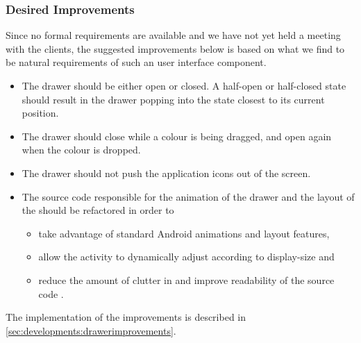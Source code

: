 \subsubsection{Desired Improvements}
Since no formal requirements are available and we have not yet held a meeting with the clients, the suggested improvements below is based on what we find to be natural requirements of such an user interface component. 

\begin{itemize}
\item The drawer should be either open or closed. 
A half-open or half-closed state should result in the drawer popping into the state closest to its current position.
\item The drawer should close while a colour is being dragged, and open again when the colour is dropped.
\item The drawer should not push the application icons out of the screen.
\item The source code responsible for the animation of the drawer and the layout of the \homeactivity should be refactored in order to
	\begin{itemize}
	\item take advantage of standard Android animations and layout features,
	\item allow the activity to dynamically adjust according to display-size and
	\item reduce the amount of clutter in and improve readability of the source code .
	\end{itemize}
\end{itemize}

The implementation of the improvements is described in \cref{sec:developments:drawerimprovements}.